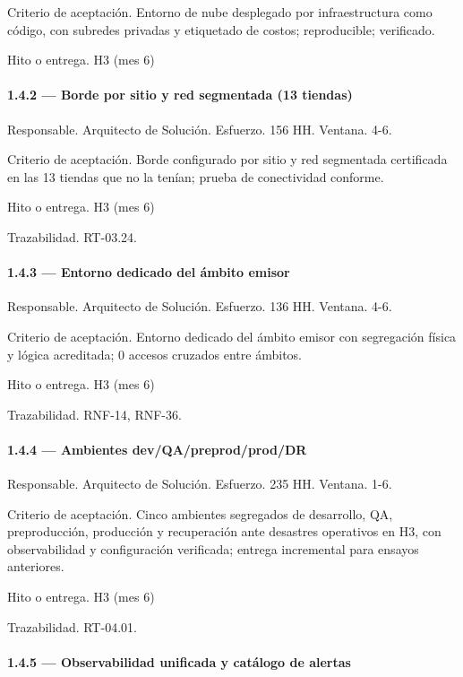 \documentclass[11pt]{article}
\begin{document}
Criterio de aceptación. Entorno de nube desplegado por infraestructura como código, con subredes privadas y etiquetado de costos; reproducible; verificado.

Hito o entrega. H3 (mes 6)

\paragraph{1.4.2 — Borde por sitio y red segmentada (13 tiendas)}

Responsable. Arquitecto de Solución. Esfuerzo. 156 HH. Ventana. 4-6.

Criterio de aceptación. Borde configurado por sitio y red segmentada certificada en las 13 tiendas que no la tenían; prueba de conectividad conforme.

Hito o entrega. H3 (mes 6)

Trazabilidad. RT-03.24.

\paragraph{1.4.3 — Entorno dedicado del ámbito emisor}

Responsable. Arquitecto de Solución. Esfuerzo. 136 HH. Ventana. 4-6.

Criterio de aceptación. Entorno dedicado del ámbito emisor con segregación física y lógica acreditada; 0 accesos cruzados entre ámbitos.

Hito o entrega. H3 (mes 6)

Trazabilidad. RNF-14, RNF-36.

\paragraph{1.4.4 — Ambientes dev/QA/preprod/prod/DR}

Responsable. Arquitecto de Solución. Esfuerzo. 235 HH. Ventana. 1-6.

Criterio de aceptación. Cinco ambientes segregados de desarrollo, QA, preproducción, producción y recuperación ante desastres operativos en H3, con observabilidad y configuración verificada; entrega incremental para ensayos anteriores.

Hito o entrega. H3 (mes 6)

Trazabilidad. RT-04.01.

\paragraph{1.4.5 — Observabilidad unificada y catálogo de alertas}
\end{document}
